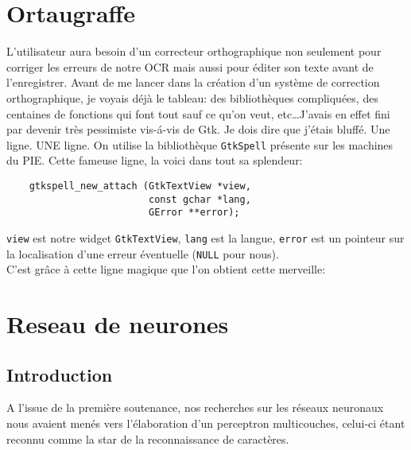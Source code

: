 \documentclass[a4paper,10pt]{report}
\begin{document}
	\section{Ortaugraffe} %
	\label{sec:ortaugraffe}
		L'utilisateur aura besoin d'un correcteur orthographique non seulement pour corriger les erreurs de notre OCR mais aussi pour \'editer son texte avant de l'enregistrer. Avant de me lancer dans la cr\'eation d'un syst\`eme de correction orthographique, je voyais d\'ej\`a le tableau: des biblioth\`eques compliqu\'ees, des centaines de fonctions qui font tout sauf ce qu'on veut, etc\ldots J'avais en effet fini par devenir tr\`es pessimiste vis-\'a-vis de Gtk. Je dois dire que j'\'etais bluff\'e. Une ligne. UNE ligne. On utilise la biblioth\`eque \verb!GtkSpell! pr\'esente sur les machines du PIE. Cette fameuse ligne, la voici dans tout sa splendeur:
		\begin{lstlisting}
    gtkspell_new_attach (GtkTextView *view,
                         const gchar *lang,
                         GError **error);
		\end{lstlisting}
		\verb!view! est notre widget \verb!GtkTextView!, \verb!lang! est la langue, \verb!error! est un pointeur sur la localisation d'une erreur \'eventuelle (\verb!NULL! pour nous).\\
		C'est gr\^ace \`a cette ligne magique que l'on obtient cette merveille:




\section{Reseau de neurones} %
\label{sec:reseau_de_neurones}

\subsection{Introduction} %
\label{sec:introduction}
A l'issue de la premi\`ere soutenance, nos recherches sur les r\'eseaux
neuronaux nous avaient men\'es vers l'\'elaboration d'un perceptron
multicouches, celui-ci \'etant reconnu comme la star de la
reconnaissance de caract\`eres.
\end{document}
